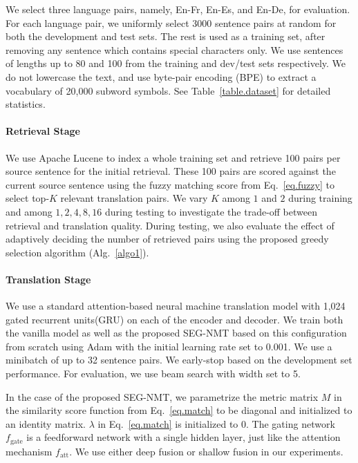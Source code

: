 We select three language pairs, namely, En-Fr, En-Es, and En-De, for evaluation. For each language pair, we uniformly select 3000 sentence pairs at random for both the development and test sets. The rest is used as a training set, after removing any sentence which contains special characters only. We use sentences of lengths up to 80 and 100 from the training and dev/test sets respectively. We do not lowercase the text, and use byte-pair encoding (BPE)\citep{sennrich2015neural} to extract a vocabulary of 20,000 subword symbols. See Table~\ref{table.dataset} for detailed statistics.

\paragraph{Retrieval Stage}

We use Apache Lucene to index a whole training set and retrieve 100 pairs per source sentence for the initial retrieval. These 100 pairs are scored against the current source sentence using the fuzzy matching score from Eq.~\eqref{eq.fuzzy} to select top-$K$ relevant translation pairs. We vary $K$ among $1$ and $2$ during training and among $1, 2, 4, 8, 16$ during testing to investigate the trade-off between retrieval and translation quality. During testing, we also evaluate the effect of adaptively deciding the number of retrieved pairs using the proposed greedy selection algorithm (Alg.~\ref{algo1}). 

\paragraph{Translation Stage}

We use a standard attention-based neural machine translation model\citep{bahdanau2014neural} with 1,024 gated recurrent units(GRU)\citep{cho2014learning} on each of the encoder and decoder. We train both the vanilla model as well as the proposed SEG-NMT based on this configuration from scratch using Adam\citep{kingma2014adam} with the initial learning rate set to 0.001. We use a minibatch of up to 32 sentence pairs. We early-stop based on the development set performance. For evaluation, we use beam search with width set to 5.

In the case of the proposed SEG-NMT, we parametrize the metric matrix $M$ in the similarity score function from Eq.~\eqref{eq.match} to be diagonal and initialized to an identity matrix. $\lambda$ in Eq.~\eqref{eq.match} is initialized to $0$. The gating network $f_{\text{gate}}$ is a feedforward network with a single hidden layer, just like the attention mechanism $f_{\text{att}}$. We use either deep fusion or shallow fusion in our experiments.

